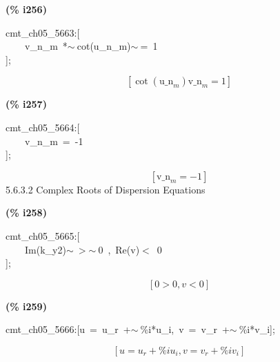 \documentclass[fleqn]{article}
\begin{document}
\noindent
\begin{minipage}[t]{4.000000em}\color{red}\bfseries
(\% i256)	
\end{minipage}
\begin{minipage}[t]{\textwidth}\color{blue}
cmt\_ch05\_5663:[\\
\ \ \ \ v\_n\_m\ *\ensuremath{\sim\ }cot(u\_n\_m)\ensuremath{\sim\ }=\ 1\\
];
\end{minipage}
\[\displaystyle \tag{\% o256} 
\left[ \cot{\left( {{\ensuremath{\mathrm{u\_ n}}}_m}\right) } {{\ensuremath{\mathrm{v\_ n}}}_m}=1\right] \mbox{}
\]


\noindent
\begin{minipage}[t]{4.000000em}\color{red}\bfseries
(\% i257)	
\end{minipage}
\begin{minipage}[t]{\textwidth}\color{blue}
cmt\_ch05\_5664:[\\
\ \ \ \ v\_n\_m\ =\ -1\\
];
\end{minipage}
\[\displaystyle \tag{\% o257} 
\left[ {{\ensuremath{\mathrm{v\_ n}}}_m}=-1\right] \mbox{}
\]
5.6.3.2     Complex Roots of Dispersion Equations


\noindent
\begin{minipage}[t]{4.000000em}\color{red}\bfseries
(\% i258)	
\end{minipage}
\begin{minipage}[t]{\textwidth}\color{blue}
cmt\_ch05\_5665:[\\
\ \ \ \ Im(k\_y2)\ensuremath{\sim\ }\ensuremath{>}\ensuremath{\sim\ }0\ ,\ Re(v)\ensuremath{<}\ 0\\
];
\end{minipage}
\[\displaystyle \tag{\% o258} 
\left[ 0\operatorname{>  }0\operatorname{,}v\operatorname{<  }0\right] \mbox{}
\]


\noindent
\begin{minipage}[t]{4.000000em}\color{red}\bfseries
(\% i259)	
\end{minipage}
\begin{minipage}[t]{\textwidth}\color{blue}
cmt\_ch05\_5666:[u\ =\ u\_r\ +\ensuremath{\sim\ }\%i*u\_i,\ v\ =\ v\_r\ +\ensuremath{\sim\ }\%i*v\_i];
\end{minipage}
\[\displaystyle \tag{\% o259} 
\left[ u={u_r}+\% i {u_i}\operatorname{,}v={v_r}+\% i {v_i}\right] \mbox{}
\]
\end{document}
